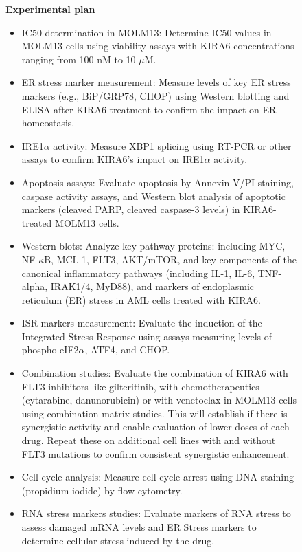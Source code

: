 \begin{figure}[htbp!]
\begin{tcolorbox}[
    colback=black!5!white,
    colframe=black!60!white,
    title=\textbf{KIRA6 for AML (continued)},
    fonttitle=\bfseries,
    arc=3mm,
    boxrule=1pt,
    bottomrule=2pt,
]
\scriptsize
\textbf{Experimental plan}
\begin{itemize}
    \item IC50 determination in MOLM13: Determine IC50 values in MOLM13 cells using viability assays with KIRA6 concentrations ranging from 100 nM to 10 $\mu$M.
    \item ER stress marker measurement: Measure levels of key ER stress markers (e.g., BiP/GRP78, CHOP) using Western blotting and ELISA after KIRA6 treatment to confirm the impact on ER homeostasis.
    \item IRE1$\alpha$ activity: Measure XBP1 splicing using RT-PCR or other assays to confirm KIRA6's impact on IRE1$\alpha$ activity.
    \item Apoptosis assays: Evaluate apoptosis by Annexin V/PI staining, caspase activity assays, and Western blot analysis of apoptotic markers (cleaved PARP, cleaved caspase-3 levels) in KIRA6-treated MOLM13 cells.
    \item Western blots: Analyze key pathway proteins: including MYC, NF-$\kappa$B, MCL-1, FLT3, AKT/mTOR, and key components of the canonical inflammatory pathways (including IL-1, IL-6, TNF-alpha, IRAK1/4, MyD88), and markers of endoplasmic reticulum (ER) stress in AML cells treated with KIRA6.
    \item ISR markers measurement: Evaluate the induction of the Integrated Stress Response using assays measuring levels of phospho-eIF2$\alpha$, ATF4, and CHOP.
    \item Combination studies: Evaluate the combination of KIRA6 with FLT3 inhibitors like gilteritinib, with chemotherapeutics (cytarabine, danunorubicin) or with venetoclax in MOLM13 cells using combination matrix studies. This will establish if there is synergistic activity and enable evaluation of lower doses of each drug. Repeat these on additional cell lines with and without FLT3 mutations to confirm consistent synergistic enhancement.
    \item Cell cycle analysis: Measure cell cycle arrest using DNA staining (propidium iodide) by flow cytometry.
    \item RNA stress markers studies: Evaluate markers of RNA stress to assess damaged mRNA levels and ER Stress markers to determine cellular stress induced by the drug.

\end{itemize}
\end{tcolorbox}
\end{figure}
